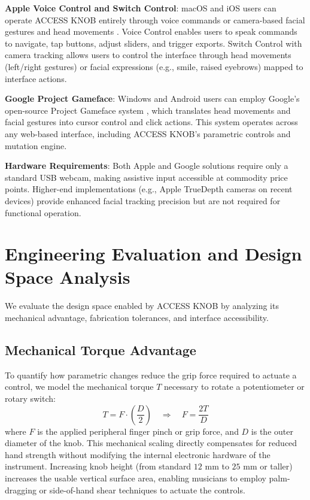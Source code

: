 \documentclass[manuscript,screen,review,anonymous]{acmart}
\begin{document}
\textbf{Apple Voice Control and Switch Control}: macOS and iOS users can operate ACCESS KNOB entirely through voice commands \cite{apple2024voicecontrol} or camera-based facial gestures and head movements \cite{apple2024switchcontrol}. Voice Control enables users to speak commands to navigate, tap buttons, adjust sliders, and trigger exports. Switch Control with camera tracking allows users to control the interface through head movements (left/right gestures) or facial expressions (e.g., smile, raised eyebrows) mapped to interface actions.

\textbf{Google Project Gameface}: Windows and Android users can employ Google's open-source Project Gameface system \cite{google2024gameface,googleblog2023gameface}, which translates head movements and facial gestures into cursor control and click actions. This system operates across any web-based interface, including ACCESS KNOB's parametric controls and mutation engine.

\textbf{Hardware Requirements}: Both Apple and Google solutions require only a standard USB webcam, making assistive input accessible at commodity price points. Higher-end implementations (e.g., Apple TrueDepth cameras on recent devices) provide enhanced facial tracking precision but are not required for functional operation.

\section{Engineering Evaluation and Design Space Analysis}

We evaluate the design space enabled by ACCESS KNOB by analyzing its mechanical advantage, fabrication tolerances, and interface accessibility.

\subsection{Mechanical Torque Advantage}
To quantify how parametric changes reduce the grip force required to actuate a control, we model the mechanical torque $T$ necessary to rotate a potentiometer or rotary switch:
\begin{equation}
T = F \cdot \left(\frac{D}{2}\right) \quad \Longrightarrow \quad F = \frac{2T}{D}
\end{equation}
where $F$ is the applied peripheral finger pinch or grip force, and $D$ is the outer diameter of the knob. This mechanical scaling directly compensates for reduced hand strength without modifying the internal electronic hardware of the instrument. Increasing knob height (from standard $12\text{ mm}$ to $25\text{ mm}$ or taller) increases the usable vertical surface area, enabling musicians to employ palm-dragging or side-of-hand shear techniques to actuate the controls.
\end{document}
